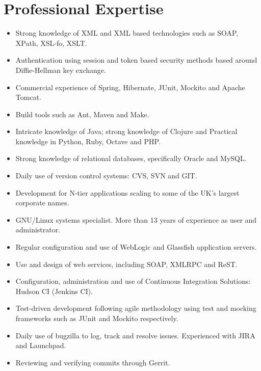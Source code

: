 \documentclass[a4paper,10pt]{moderncv}
\begin{document}
\section{Professional Expertise}
\begin{itemize}
\item Strong knowledge of XML and XML based technologies such as SOAP, XPath, XSL-fo, XSLT.
\item Authentication using session and token based security methods based around Diffie-Hellman key exchange.
\item Commercial experience of Spring, Hibernate, JUnit, Mockito and Apache Tomcat.
\item Build tools such as Ant, Maven and Make.
\item Intricate knowledge of Java; strong knowledge of Clojure and Practical knowledge in Python, Ruby, Octave and PHP.
\item Strong knowledge of relational databases, specifically Oracle and MySQL.
\item Daily use of version control systems: CVS, SVN and GIT.
\item Development for N-tier applications scaling to some of the UK's largest corporate names.
\item GNU/Linux systems specialist. More than 13 years of experience as user
  and administrator.
\item Regular configuration and use of WebLogic and Glassfish application servers.
\item Use and design of web services, including SOAP, XMLRPC and ReST.
\item Configuration, administration and use of Continuous Integration
Solutions: Hudson CI (Jenkins CI).
\item Test-driven development following agile methodology using test and mocking frameworks such as JUnit and Mockito respectively.
\item Daily use of bugzilla to log, track and resolve issues. Experienced with JIRA and Launchpad.
\item Reviewing and verifying commits through Gerrit.
\end{itemize}
\end{document}
